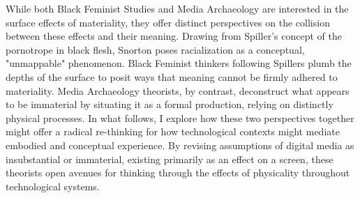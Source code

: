 \documentclass[11pt]{article}
\begin{document}
While both Black Feminist Studies and Media Archaeology are interested
in the surface effects of materiality, they offer distinct
perspectives on the collision between these effects and their
meaning. Drawing from Spiller's concept of the pornotrope in black
flesh, Snorton poses racialization as a conceptual, "unmappable"
phenomenon. Black Feminist thinkers following Spillers plumb the
depths of the surface to posit ways that meaning cannot be firmly
adhered to materiality. Media Archaeology theorists, by contrast,
deconstruct what appears to be immaterial by situating it as a formal
production, relying on distinctly physical processes. In what follows,
I explore how these two perspectives together might offer a radical
re-thinking for how technological contexts might mediate embodied and
conceptual experience. By revising assumptions of digital media as
insubstantial or immaterial, existing primarily as an effect on a
screen, these theorists open avenues for thinking through the effects
of physicality throughout technological systems.
\end{document}
